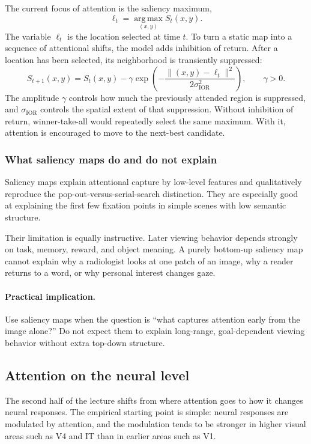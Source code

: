 The current focus of attention is the saliency maximum,
\[
\ell_t = \operatorname*{arg\,max}_{(x,y)} S_t(x,y).
\]
The variable \(\ell_t\) is the location selected at time \(t\). To turn a static map into a sequence of attentional shifts, the model adds inhibition of return. After a location has been selected, its neighborhood is transiently suppressed:
\[
S_{t+1}(x,y)
=
S_t(x,y)
-
\gamma
\exp\left(
-\frac{\|(x,y)-\ell_t\|^2}{2\sigma_{\mathrm{IOR}}^2}
\right),
\qquad
\gamma>0 .
\]
The amplitude \(\gamma\) controls how much the previously attended region is suppressed, and \(\sigma_{\mathrm{IOR}}\) controls the spatial extent of that suppression. Without inhibition of return, winner-take-all would repeatedly select the same maximum. With it, attention is encouraged to move to the next-best candidate.

\subsubsection{What saliency maps do and do not explain}

Saliency maps explain attentional capture by low-level features and qualitatively reproduce the pop-out-versus-serial-search distinction. They are especially good at explaining the first few fixation points in simple scenes with low semantic structure.

Their limitation is equally instructive. Later viewing behavior depends strongly on task, memory, reward, and object meaning. A purely bottom-up saliency map cannot explain why a radiologist looks at one patch of an image, why a reader returns to a word, or why personal interest changes gaze.

\paragraph{Practical implication.}
Use saliency maps when the question is ``what captures attention early from the image alone?'' Do not expect them to explain long-range, goal-dependent viewing behavior without extra top-down structure.

\subsection{Attention on the neural level}

The second half of the lecture shifts from where attention goes to how it changes neural responses. The empirical starting point is simple: neural responses are modulated by attention, and the modulation tends to be stronger in higher visual areas such as V4 and IT than in earlier areas such as V1.


